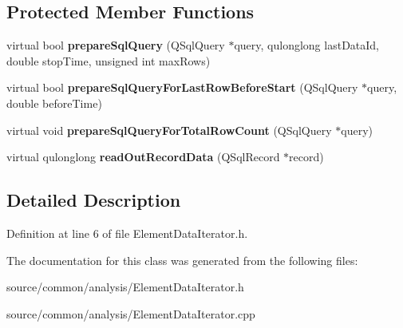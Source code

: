 \subsection*{Protected Member Functions}
\begin{DoxyCompactItemize}
\item 
\hypertarget{class_picto_1_1_element_data_iterator_a20fcea2f7d02a0eab349bf529e79904d}{virtual bool {\bfseries prepare\-Sql\-Query} (Q\-Sql\-Query $\ast$query, qulonglong last\-Data\-Id, double stop\-Time, unsigned int max\-Rows)}\label{class_picto_1_1_element_data_iterator_a20fcea2f7d02a0eab349bf529e79904d}

\item 
\hypertarget{class_picto_1_1_element_data_iterator_afde10067fb1b3b9a67e1b7e433dc35ed}{virtual bool {\bfseries prepare\-Sql\-Query\-For\-Last\-Row\-Before\-Start} (Q\-Sql\-Query $\ast$query, double before\-Time)}\label{class_picto_1_1_element_data_iterator_afde10067fb1b3b9a67e1b7e433dc35ed}

\item 
\hypertarget{class_picto_1_1_element_data_iterator_a78383cd4a2781e148f15240fc2222c51}{virtual void {\bfseries prepare\-Sql\-Query\-For\-Total\-Row\-Count} (Q\-Sql\-Query $\ast$query)}\label{class_picto_1_1_element_data_iterator_a78383cd4a2781e148f15240fc2222c51}

\item 
\hypertarget{class_picto_1_1_element_data_iterator_a37a4ce26d6ca3ab5cc6692e4dd635f7a}{virtual qulonglong {\bfseries read\-Out\-Record\-Data} (Q\-Sql\-Record $\ast$record)}\label{class_picto_1_1_element_data_iterator_a37a4ce26d6ca3ab5cc6692e4dd635f7a}

\end{DoxyCompactItemize}


\subsection{Detailed Description}


Definition at line 6 of file Element\-Data\-Iterator.\-h.



The documentation for this class was generated from the following files\-:\begin{DoxyCompactItemize}
\item 
source/common/analysis/Element\-Data\-Iterator.\-h\item 
source/common/analysis/Element\-Data\-Iterator.\-cpp\end{DoxyCompactItemize}

